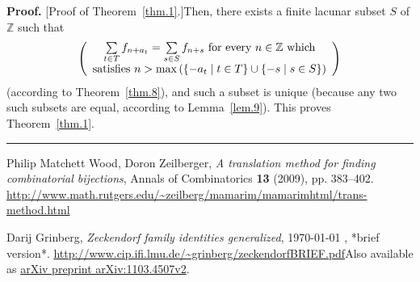 \documentclass[numbers=enddot,12pt,final,onecolumn,notitlepage]{scrartcl}%
\numberwithin{exer}{section}
\theoremstyle{definition}
\newenvironment{proof}[1][Proof]{\noindent\textbf{#1.} }{\ \rule{0.5em}{0.5em}}
\let\sumnonlimits\sum
\renewcommand{\sum}{\sumnonlimits\limits}
\begin{document}
\begin{proof}
[Proof of Theorem~\ref{thm.1}.]Then, there exists a finite lacunar subset $S$
of $\mathbb{Z}$ such that
\[
\left(
\begin{array}
[c]{c}%
\sum\limits_{t\in T}f_{n+a_{t}}=\sum\limits_{s\in S}f_{n+s}\text{ for every
}n\in\mathbb{Z}\text{ which}\\
\text{satisfies }n>\max\left(  \left\{  -a_{t}\mid t\in T\right\}
\cup\left\{  -s\mid s\in S\right\}  \right)
\end{array}
\right)
\]
(according to Theorem~\ref{thm.8}), and such a subset is unique (because any
two such subsets are equal, according to Lemma~\ref{lem.9}). This proves
Theorem~\ref{thm.1}.
\end{proof}

\begin{thebibliography}{9}                                                                                                %


Philip Matchett Wood, Doron Zeilberger, \textit{A translation
method for finding combinatorial bijections}, Annals of Combinatorics
\textbf{13} (2009), pp. 383--402. \newline\url{http://www.math.rutgers.edu/~zeilberg/mamarim/mamarimhtml/trans-method.html}

Darij Grinberg, \textit{Zeckendorf family identities
generalized},
\today
, *brief version*.\newline%
\url{http://www.cip.ifi.lmu.de/~grinberg/zeckendorfBRIEF.pdf}\newline Also
available as \href{https://arxiv.org/abs/1103.4507v2}{arXiv preprint
arXiv:1103.4507v2}.
\end{thebibliography}
\end{document}
